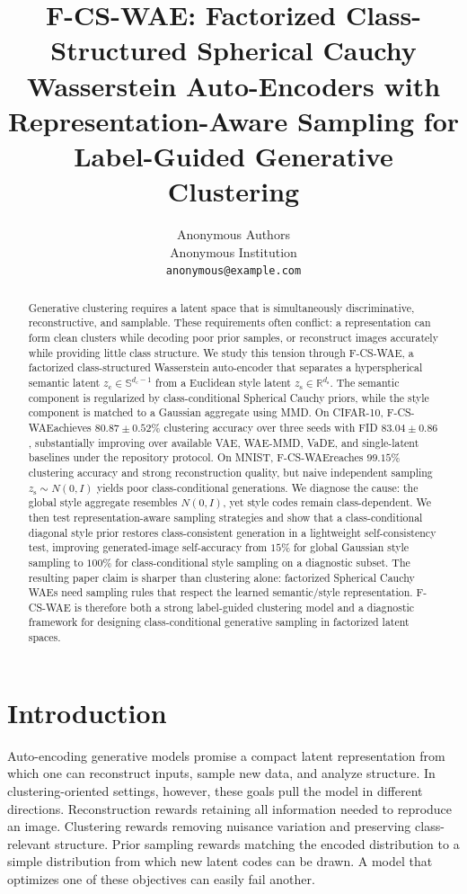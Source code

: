 \documentclass[10pt]{article}
\title{\vspace{-1.0em}
F-CS-WAE: Factorized Class-Structured Spherical Cauchy Wasserstein Auto-Encoders
with Representation-Aware Sampling for Label-Guided Generative Clustering
\vspace{-0.3em}}
\author{
Anonymous Authors\\
\small Anonymous Institution\\
\small \texttt{anonymous@example.com}
}
\date{}
\newcommand{\ours}{F-CS-WAE}
\newcommand{\zc}{z_{\mathrm{c}}}
\newcommand{\zs}{z_{\mathrm{s}}}
\newcommand{\Sph}{\mathbb{S}}
\newcommand{\R}{\mathbb{R}}
\begin{document}
\maketitle

\begin{abstract}
Generative clustering requires a latent space that is simultaneously discriminative, reconstructive, and samplable. These requirements often conflict: a representation can form clean clusters while decoding poor prior samples, or reconstruct images accurately while providing little class structure. We study this tension through \ours, a factorized class-structured Wasserstein auto-encoder that separates a hyperspherical semantic latent $\zc\in\Sph^{d_{\mathrm{c}}-1}$ from a Euclidean style latent $\zs\in\R^{d_{\mathrm{s}}}$. The semantic component is regularized by class-conditional Spherical Cauchy priors, while the style component is matched to a Gaussian aggregate using MMD. On CIFAR-10, \ours achieves $80.87\pm0.52\%$ clustering accuracy over three seeds with FID $83.04\pm0.86$, substantially improving over available VAE, WAE-MMD, VaDE, and single-latent baselines under the repository protocol. On MNIST, \ours reaches $99.15\%$ clustering accuracy and strong reconstruction quality, but naive independent sampling $\zs\sim N(0,I)$ yields poor class-conditional generations. We diagnose the cause: the global style aggregate resembles $N(0,I)$, yet style codes remain class-dependent. We then test representation-aware sampling strategies and show that a class-conditional diagonal style prior restores class-consistent generation in a lightweight self-consistency test, improving generated-image self-accuracy from $15\%$ for global Gaussian style sampling to $100\%$ for class-conditional style sampling on a diagnostic subset. The resulting paper claim is sharper than clustering alone: factorized Spherical Cauchy WAEs need sampling rules that respect the learned semantic/style representation. \ours{} is therefore both a strong label-guided clustering model and a diagnostic framework for designing class-conditional generative sampling in factorized latent spaces.
\end{abstract}

\section{Introduction}

Auto-encoding generative models promise a compact latent representation from which one can reconstruct inputs, sample new data, and analyze structure. In clustering-oriented settings, however, these goals pull the model in different directions. Reconstruction rewards retaining all information needed to reproduce an image. Clustering rewards removing nuisance variation and preserving class-relevant structure. Prior sampling rewards matching the encoded distribution to a simple distribution from which new latent codes can be drawn. A model that optimizes one of these objectives can easily fail another.
\end{document}
